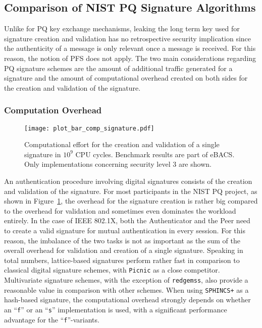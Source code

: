 \subsection{Comparison of NIST PQ Signature Algorithms}

Unlike for \ac{PQ} key exchange mechanisms, leaking the long term key used for signature creation and validation has no retrospective security implication since the authenticity of a message is only relevant once a message is received. For this reason, the notion of \ac{PFS} does not apply. The two main considerations regarding \ac{PQ} signature schemes are the amount of additional traffic generated for a signature and the amount of computational overhead created on both sides for the creation and validation of the signature. 

\subsubsection{Computation Overhead}
\begin{figure}[ht]
    \centering\texttt{[image: plot\_bar\_comp\_signature.pdf]}
    \caption{Computational effort for the creation and validation of a single signature in \(10^9\) \acs{CPU} cycles. Benchmark results are part of eBACS\cite{eBACS}. Only implementations concerning security level 3 are shown.}\label{fig:pq_sig_comp}
\end{figure}

An authentication procedure involving digital signatures consists of the creation and validation of the signature. For most participants in the \ac{NIST} \ac{PQ} project, as shown in Figure~\ref{fig:pq_sig_comp}, the overhead for the signature creation is rather big compared to the overhead for validation and sometimes even dominates the workload entirely. In the case of IEEE 802.1X, both the Authenticator and the Peer need to create a valid signature for mutual authentication in every session. For this reason, the imbalance of the two tasks is not as important as the sum of the overall overhead for validation and creation of a single signature. Speaking in total numbers, lattice-based signatures perform rather fast in comparison to classical digital signature schemes, with \texttt{Picnic} as a close competitor. Multivariate signature schemes, with the exception of \texttt{redgemss}, also provide a reasonable value in comparison with other schemes. When using \texttt{SPHINCS+} as a hash-based signature, the computational overhead strongly depends on whether an ``\texttt{f}'' or an ``\texttt{s}'' implementation is used, with a significant performance advantage for the ``\texttt{f}''-variants.


